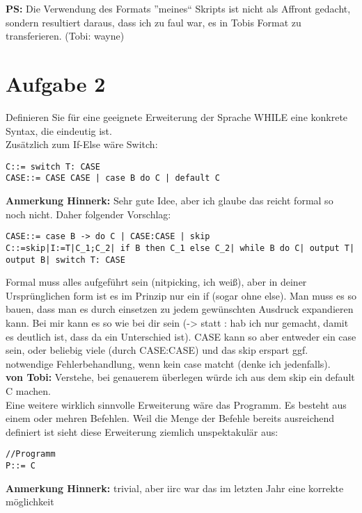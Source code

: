 \documentclass[ngerman,a4paper]{report}
\begin{document}
\textbf{PS:} Die Verwendung des Formats ''meines`` Skripts ist nicht als Affront gedacht, sondern resultiert daraus, dass ich zu faul war, es in Tobis Format zu transferieren. (Tobi: wayne)


\section*{Aufgabe 2}
Definieren Sie für eine geeignete Erweiterung der Sprache WHILE eine konkrete Syntax, die eindeutig ist.\\
Zusätzlich zum If-Else wäre Switch:
\begin{lstlisting}
C::= switch T: CASE
CASE::= CASE CASE | case B do C | default C
\end{lstlisting}
\textbf{Anmerkung Hinnerk:}
Sehr gute Idee, aber ich glaube das reicht formal so noch nicht. Daher folgender Vorschlag:\\
\begin{lstlisting}
CASE::= case B -> do C | CASE:CASE | skip
C::=skip|I:=T|C_1;C_2| if B then C_1 else C_2| while B do C| output T| output B| switch T: CASE
\end{lstlisting}
Formal muss alles aufgeführt sein (nitpicking, ich weiß), aber in deiner Ursprünglichen form ist es im Prinzip nur ein if (sogar ohne else). Man muss es so bauen, dass man es durch einsetzen zu jedem gewünschten Ausdruck expandieren kann. Bei mir kann es so wie bei dir sein (-> statt : hab ich nur gemacht, damit es deutlich ist, dass da ein Unterschied ist).
CASE kann so aber entweder ein case sein, oder beliebig viele (durch CASE:CASE) und das skip erspart ggf. notwendige Fehlerbehandlung, wenn kein case matcht (denke ich jedenfalls).\\
\textbf{von Tobi:}
Verstehe, bei genauerem überlegen würde ich aus dem skip ein default C machen.\\

Eine weitere wirklich sinnvolle Erweiterung wäre das Programm. Es besteht aus einem oder mehren Befehlen. Weil die Menge der Befehle bereits ausreichend definiert ist sieht diese Erweiterung ziemlich unspektakulär aus:
\begin{lstlisting}
//Programm
P::= C 
\end{lstlisting}
\textbf{Anmerkung Hinnerk:} trivial, aber iirc war das im letzten Jahr eine korrekte möglichkeit
\end{document}
